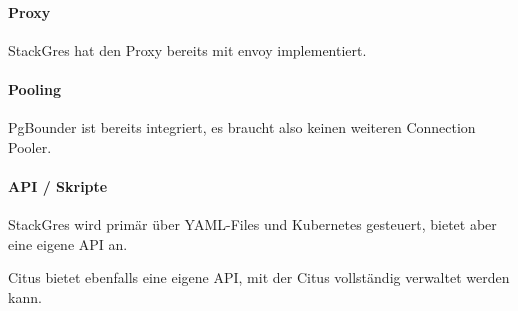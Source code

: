 \begin{flushleft}
    \paragraph{Proxy}
    StackGres hat den Proxy bereits mit envoy\cite{QAGSHVBL} implementiert.
\end{flushleft}
\begin{flushleft}
    \paragraph{Pooling}
    PgBounder\cite{ATBELZ2X} ist bereits integriert, es braucht also keinen weiteren \Gls{Connection Pooler}.
\end{flushleft}
\begin{flushleft}
    \paragraph{API / Skripte}
    StackGres wird primär über YAML-Files und Kubernetes gesteuert, bietet aber eine eigene API an.
\end{flushleft}
\begin{flushleft}
    Citus bietet ebenfalls eine eigene API, mit der Citus vollständig verwaltet werden kann.
\end{flushleft}
